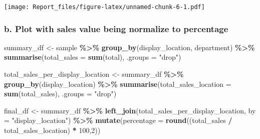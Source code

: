 \documentclass[
]{article}
\newenvironment{Shaded}{\begin{snugshade}}{\end{snugshade}}
\newcommand{\AttributeTok}[1]{\textcolor[rgb]{0.13,0.29,0.53}{#1}}
\newcommand{\DecValTok}[1]{\textcolor[rgb]{0.00,0.00,0.81}{#1}}
\newcommand{\FunctionTok}[1]{\textcolor[rgb]{0.13,0.29,0.53}{\textbf{#1}}}
\newcommand{\NormalTok}[1]{#1}
\newcommand{\OtherTok}[1]{\textcolor[rgb]{0.56,0.35,0.01}{#1}}
\newcommand{\SpecialCharTok}[1]{\textcolor[rgb]{0.81,0.36,0.00}{\textbf{#1}}}
\newcommand{\StringTok}[1]{\textcolor[rgb]{0.31,0.60,0.02}{#1}}
\begin{document}
\texttt{[image: Report\_files/figure-latex/unnamed-chunk-6-1.pdf]}

\hypertarget{b.-plot-with-sales-value-being-normalize-to-percentage}{%
\subsubsection{b. Plot with sales value being normalize to
percentage}\label{b.-plot-with-sales-value-being-normalize-to-percentage}}

\begin{Shaded}
\begin{Highlighting}[]
\NormalTok{summary\_df }\OtherTok{\textless{}{-}}\NormalTok{ sample }\SpecialCharTok{\%\textgreater{}\%}
  \FunctionTok{group\_by}\NormalTok{(display\_location, department) }\SpecialCharTok{\%\textgreater{}\%}
  \FunctionTok{summarise}\NormalTok{(}\AttributeTok{total\_sales =} \FunctionTok{sum}\NormalTok{(total), }\AttributeTok{.groups =} \StringTok{"drop"}\NormalTok{)}

\NormalTok{total\_sales\_per\_display\_location }\OtherTok{\textless{}{-}}\NormalTok{ summary\_df }\SpecialCharTok{\%\textgreater{}\%}
  \FunctionTok{group\_by}\NormalTok{(display\_location) }\SpecialCharTok{\%\textgreater{}\%}
  \FunctionTok{summarise}\NormalTok{(}\AttributeTok{total\_sales\_location =} \FunctionTok{sum}\NormalTok{(total\_sales), }\AttributeTok{.groups =} \StringTok{"drop"}\NormalTok{)}

\NormalTok{final\_df }\OtherTok{\textless{}{-}}\NormalTok{ summary\_df }\SpecialCharTok{\%\textgreater{}\%}
  \FunctionTok{left\_join}\NormalTok{(total\_sales\_per\_display\_location, }\AttributeTok{by =} \StringTok{"display\_location"}\NormalTok{) }\SpecialCharTok{\%\textgreater{}\%}
  \FunctionTok{mutate}\NormalTok{(}\AttributeTok{percentage =} \FunctionTok{round}\NormalTok{((total\_sales }\SpecialCharTok{/}\NormalTok{ total\_sales\_location) }\SpecialCharTok{*} \DecValTok{100}\NormalTok{,}\DecValTok{2}\NormalTok{))}


\end{Highlighting}
\end{Shaded}
\end{document}
